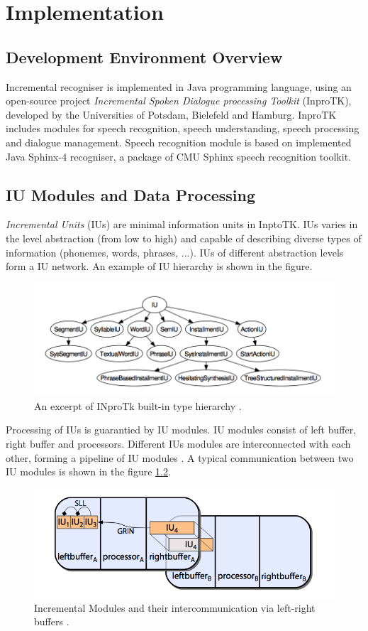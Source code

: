 \chapter{Implementation}
\label{chap:implem}
\section {Development Environment Overview}
Incremental recogniser is implemented in Java programming language, using
an open-source project \textit {Incremental Spoken Dialogue processing
Toolkit} (InproTK), developed by the Universities of Potsdam, Bielefeld and
Hamburg. InproTK includes modules for speech recognition, speech understanding,
speech processing and dialogue management. Speech recognition module is based on
implemented Java Sphinx-4 recogniser, a package of CMU Sphinx speech recognition
toolkit.
\section {IU Modules and Data Processing}
\textit {Incremental Units} (IUs) are minimal information units in InptoTK.
IUs varies in the level abstraction (from low to high) and capable of
describing diverse types of information (phonemes, words, phrases, ...). IUs
of different abstraction levels form a IU network. An example of IU hierarchy is
shown in the figure.
\begin{figure}[htbp]
  \centering
    \includegraphics[width=1.0\textwidth]{images/IUs.png}
 \caption{ An excerpt of INproTk built-in type hierarchy \parencite
 {baumann2013:phd}.}
  \label{fig:IUs}
\end {figure}
Processing of IUs is guarantied by IU modules. IU
modules consist of left buffer, right buffer and processors.  
Different IUs modules are interconnected with each other, forming a pipeline of IU modules \parencite {baumann2013:phd}. A typical
communication between two IU modules is shown in the figure \ref{fig:IUs}.
\begin{figure}[htbp]
  \centering
    \includegraphics[width=1.0\textwidth]{images/iuandbuffer.png}
 \caption{ Incremental Modules and their intercommunication via left-right
 buffers \parencite {baumann2013:phd}.}
  \label{fig:IUs}
\end {figure}
